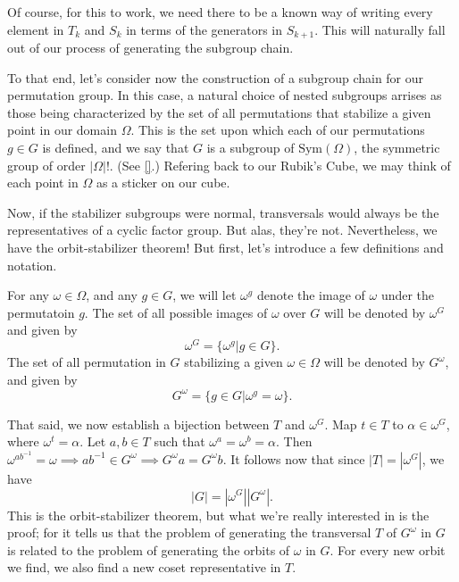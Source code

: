 \documentclass[12pt]{article}
\begin{document}
Of course, for this to work, we need there to be a known way of
writing every element in $T_k$ and $S_k$ in terms of the generators in $S_{k+1}$.
This will naturally fall out of our process of generating the subgroup chain.

To that end, let's consider now the construction of a subgroup chain for
our permutation group.  In this case, a natural choice of nested subgroups arrises
as those being characterized by the set of all permutations that stabilize a
given point in our domain $\Omega$.  This is the set upon which each of our
permutations $g\in G$ is defined, and we say that $G$ is a subgroup of $\mbox{Sym}(\Omega)$,
the symmetric group of order $|\Omega|!$.  (See \ref{}.)  Refering back to our Rubik's
Cube, we may think of each point in $\Omega$ as a sticker on our cube.

Now, if the stabilizer subgroups were normal, transversals would always be
the representatives of a cyclic factor group.  But alas, they're not.  Nevertheless,
we have the orbit-stabilizer theorem!  But first, let's introduce a few definitions and
notation.

For any $\omega\in\Omega$, and any $g\in G$, we will let $\omega^g$ denote
the image of $\omega$ under the permutatoin $g$.  The set of all possible
images of $\omega$ over $G$ will be denoted by $\omega^G$ and given by
\begin{equation*}
\omega^G = \{\omega^g|g\in G\}.
\end{equation*}
The set of all permutation in $G$ stabilizing a given $\omega\in\Omega$
will be denoted by $G^\omega$, and given by
\begin{equation*}
G^\omega = \{g\in G|\omega^g=\omega\}.
\end{equation*}

That said, we now establish a bijection between $T$ and $\omega^G$.
Map $t\in T$ to $\alpha\in\omega^G$, where $\omega^t=\alpha$.
Let $a,b\in T$ such that $\omega^a=\omega^b=\alpha$.
Then $\omega^{ab^{-1}}=\omega\implies ab^{-1}\in G^{\omega}\implies G^{\omega}a=G^{\omega}b$.
It follows now that since $|T|=|\omega^G|$, we have
\begin{equation*}
|G|=|\omega^G||G^{\omega}|.
\end{equation*}
This is the orbit-stabilizer theorem, but what we're really interested in
is the proof; for it tells us that the problem of generating the transversal $T$ of $G^{\omega}$ in $G$ is
related to the problem of generating the orbits of $\omega$ in $G$.
For every new orbit we find, we also find a new coset representative in $T$.
\end{document}
